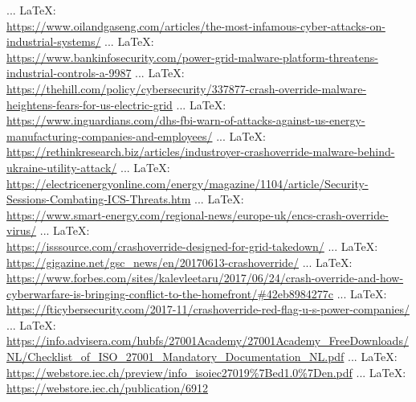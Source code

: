 \begin{thebibliography}{99}
{{{			 ... \LaTeX:\\ \url{https://www.oilandgaseng.com/articles/the-most-infamous-cyber-attacks-on-industrial-systems/}
			 ... \LaTeX:\\ \url{https://www.bankinfosecurity.com/power-grid-malware-platform-threatens-industrial-controls-a-9987}
			 ... \LaTeX:\\ \url{https://thehill.com/policy/cybersecurity/337877-crash-override-malware-heightens-fears-for-us-electric-grid}
			 ... \LaTeX:\\ \url{https://www.inguardians.com/dhs-fbi-warn-of-attacks-against-us-energy-manufacturing-companies-and-employees/}
			 ... \LaTeX:\\ \url{https://rethinkresearch.biz/articles/industroyer-crashoverride-malware-behind-ukraine-utility-attack/}
			 ... \LaTeX:\\ \url{https://electricenergyonline.com/energy/magazine/1104/article/Security-Sessions-Combating-ICS-Threats.htm}
			 ... \LaTeX:\\ \url{https://www.smart-energy.com/regional-news/europe-uk/encs-crash-override-virus/}
			 ... \LaTeX:\\ \url{https://isssource.com/crashoverride-designed-for-grid-takedown/}
			 ... \LaTeX:\\ \url{https://gigazine.net/gsc_news/en/20170613-crashoverride/}
			 ... \LaTeX:\\ \url{https://www.forbes.com/sites/kalevleetaru/2017/06/24/crash-override-and-how-cyberwarfare-is-bringing-conflict-to-the-homefront/#42eb8984277c}
			 ... \LaTeX:\\ \url{https://fticybersecurity.com/2017-11/crashoverride-red-flag-u-s-power-companies/}
			 ... \LaTeX:\\ \url{https://info.advisera.com/hubfs/27001Academy/27001Academy_FreeDownloads/NL/Checklist_of_ISO_27001_Mandatory_Documentation_NL.pdf}
			 ... \LaTeX:\\ \url{https://webstore.iec.ch/preview/info_isoiec27019%7Bed1.0%7Den.pdf}
			 ... \LaTeX:\\ \url{https://webstore.iec.ch/publication/6912}
}}}
\end{thebibliography}
